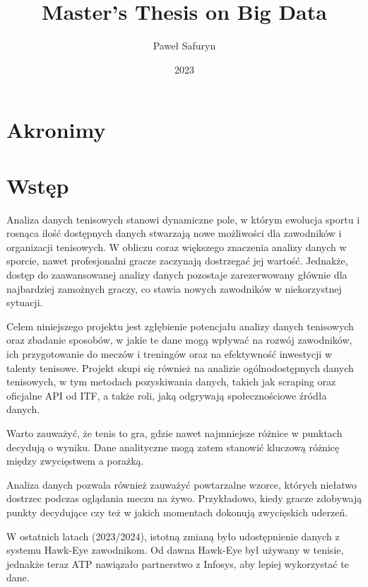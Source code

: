 \documentclass[12pt, a4paper]{article}
\title{Master's Thesis on Big Data}
\author{Paweł Safuryn}
\date{2023}
\begin{document}


\tableofcontents
\newpage

\section*{Akronimy}
\begin{acronym}
\end{acronym}



\section{Wstęp}
Analiza danych tenisowych stanowi dynamiczne pole, w którym ewolucja sportu i rosnąca ilość dostępnych danych stwarzają nowe możliwości dla zawodników i organizacji tenisowych. W obliczu coraz większego znaczenia analizy danych w sporcie, nawet profesjonalni gracze zaczynają dostrzegać jej wartość. Jednakże, dostęp do zaawansowanej analizy danych pozostaje zarezerwowany głównie dla najbardziej zamożnych graczy, co stawia nowych zawodników w niekorzystnej sytuacji.

Celem niniejszego projektu jest zgłębienie potencjału analizy danych tenisowych oraz zbadanie sposobów, w jakie te dane mogą wpływać na rozwój zawodników, ich przygotowanie do meczów i treningów oraz na efektywność inwestycji w talenty tenisowe. Projekt skupi się również na analizie ogólnodostępnych danych tenisowych, w tym metodach pozyskiwania danych, takich jak scraping oraz oficjalne API od ITF, a także roli, jaką odgrywają społecznościowe źródła danych.

Warto zauważyć, że tenis to gra, gdzie nawet najmniejsze różnice w punktach decydują o wyniku. Dane analityczne mogą zatem stanowić kluczową różnicę między zwycięstwem a porażką.

Analiza danych pozwala również zauważyć powtarzalne wzorce, których niełatwo dostrzec podczas oglądania meczu na żywo. Przykładowo, kiedy gracze zdobywają punkty decydujące czy też w jakich momentach dokonują zwycięskich uderzeń.

W ostatnich latach (2023/2024), istotną zmianą było udostępnienie danych z systemu Hawk-Eye zawodnikom. Od dawna Hawk-Eye był używany w tenisie, jednakże teraz ATP nawiązało partnerstwo z Infosys, aby lepiej wykorzystać te dane.
\end{document}
